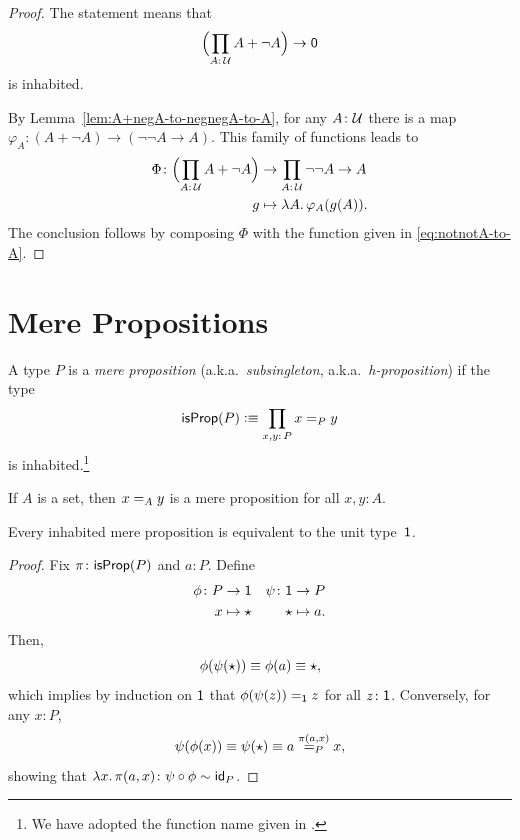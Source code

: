 \begin{proof}
    The statement means that
    \[
        \Bigl(\prod_{A\colon\univ}A+\neg A\Bigr)\to\fun0
    \]
    is inhabited.

    By Lemma~\ref{lem:A+negA-to-negnegA-to-A}, for any $A\colon\univ$ there is a map $\varphi_A\colon(A+\neg A)\to(\neg\neg A\to A)$. This family of functions leads to
    \begin{align*}
        \Phi\colon\Bigl(\prod_{A\colon\univ}A+\neg A\Bigr)
            &\to\prod_{A\colon\univ}\neg\neg A\to A\\
        g&\mapsto\lambda A.\,\varphi_A(g(A)).
    \end{align*}
    The conclusion follows by composing $\Phi$ with the function given in \eqref{eq:notnotA-to-A}.
\end{proof}

\section{Mere Propositions}

\begin{defn}
    A type $P$ is a \textsl{mere proposition} (a.k.a.~\textsl{subsingleton}, a.k.a.~\textsl{h-proposition}) if the type
    \[
        \fun{isProp}(P)\defeq\prod_{x,y\colon P}x\eq Py
    \]
    is inhabited.\footnote{We have adopted the function name given in \citep{hottbook}.}
\end{defn}

\begin{rem}\label{rem:ids-in-a-set-are-mere-propositions}
    If $A$ is a set, then $x\mathrel{=_{A}}y$ is a mere proposition for all $x,y\colon A$.
\end{rem}

\begin{lem}\label{lem:mere-prop-and-1}
    Every inhabited mere proposition is equivalent to the unit type\/~$\mathsf{1}$.
\end{lem}

\begin{proof}
    Fix $\pi\colon\fun{isProp}(P)$ and $a\colon P$. Define
    \begin{align*}
        \phi\colon P&\to\fun1 & \psi\colon\fun1&\to P\\
        x&\mapsto\fun\star & \fun\star&\mapsto a.
    \end{align*}
    Then,
    \[
        \phi(\psi(\mathsf{\star}))\equiv\phi(a)\equiv\mathsf{\star},
    \]
    which implies by induction on $\mathsf{1}$ that $\phi(\psi(z))\mathrel{=_{\mathsf{1}}}z$ for all\/ $z\colon\fun1$. Conversely, for any $x\colon P$,
    \[
        \psi(\phi(x))\equiv\psi(\mathsf{\star})\equiv a \stackrel{\pi(a,x)}{\mathrel{=_{P}}} x,
    \]
    showing that $\lambda x.\,\pi(a,x)\colon\psi\circ\phi\sim\id_P$.
\end{proof}

